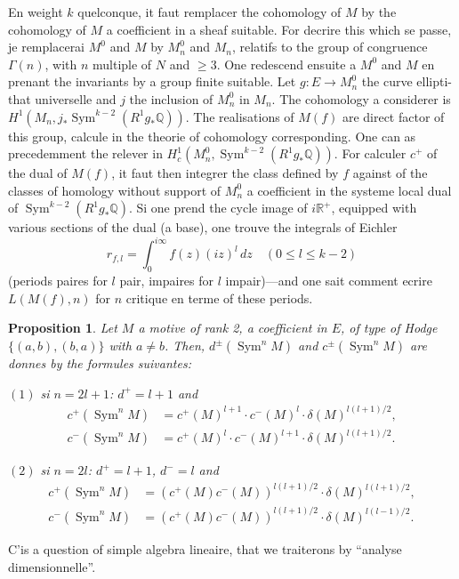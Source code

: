 \documentclass[12pt,a4paper]{article}
\theoremstyle{plain}
\newtheorem{proposition}[theorem]{Proposition}
\theoremstyle{definition}
\theoremstyle{remark}
\DeclareMathOperator{\Sym}{Sym}
\newcommand{\Q}{\mathbb{Q}}
\newcommand{\R}{\mathbb{R}}
\begin{document}
En weight $k$ quelconque, it faut remplacer the cohomology of $M$ by the cohomology
of $M$ a coefficient in a sheaf suitable. For decrire this which se passe, je
remplacerai $M^0$ and $M$ by $M^0_n$ and $M_n$, relatifs to the group of congruence
$\Gamma(n)$, with $n$ multiple of $N$ and $\geq 3$. One redescend ensuite a $M^0$ and $M$ en prenant
the invariants by a group finite suitable. Let $g: E \to M^0_n$ the curve ellipti-
that universelle and $j$ the inclusion of $M^0_n$ in $M_n$. The cohomology a considerer is
$H^1(M_n, j_* \Sym^{k-2}(R^1 g_* \Q))$. The realisations of $M(f)$ are direct factor of this
group, calcule in the theorie of cohomology corresponding. One can as
precedemment the relever in $H^1_c(M^0_n, \Sym^{k-2}(R^1 g_* \Q))$. For calculer $c^+$ of the
dual of $M(f)$, it faut then integrer the class defined by $f$ against of the classes
of homology without support of $M^0_n$ a coefficient in the systeme local dual of
$\Sym^{k-2}(R^1 g_* \Q)$. Si one prend the cycle image of $i\R^+$, equipped with various sections
of the dual (a base), one trouve the integrals of Eichler
\[
r_{f,l} = \int_0^{i\infty} f(z) (iz)^l \, dz \quad (0 \leq l \leq k-2)
\]
(periods paires for $l$ pair, impaires for $l$ impair)---and one sait comment ecrire
$L(M(f), n)$ for $n$ critique en terme of these periods.

\begin{proposition}\label{prop:7.7}
Let $M$ a motive of rank 2, a coefficient in $E$, of type of Hodge
$\{(a,b), (b,a)\}$ with $a \neq b$. Then, $d^\pm(\Sym^n M)$ and $c^\pm(\Sym^n M)$ are donnes
by the formules suivantes:

$(1)$ si $n = 2l+1$: $d^+ = l+1$ and
\begin{align*}
c^+(\Sym^n M) &= c^+(M)^{l+1} \cdot c^-(M)^l \cdot \delta(M)^{l(l+1)/2},\\
c^-(\Sym^n M) &= c^+(M)^l \cdot c^-(M)^{l+1} \cdot \delta(M)^{l(l+1)/2}.
\end{align*}

$(2)$ si $n = 2l$: $d^+ = l+1$, $d^- = l$ and
\begin{align*}
c^+(\Sym^n M) &= (c^+(M) c^-(M))^{l(l+1)/2} \cdot \delta(M)^{l(l+1)/2},\\
c^-(\Sym^n M) &= (c^+(M) c^-(M))^{l(l+1)/2} \cdot \delta(M)^{l(l-1)/2}.
\end{align*}
\end{proposition}

C'is a question of simple algebra lineaire, that we traiterons by ``analyse
dimensionnelle''.
\end{document}
